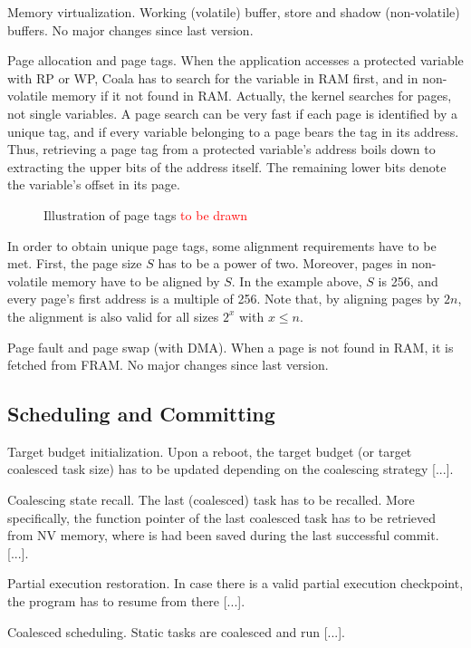 Memory virtualization. Working (volatile) buffer, store and shadow (non-volatile) buffers. No major changes since last version.

Page allocation and page tags. When the application accesses a protected variable with RP or WP, Coala has to search for the variable in RAM first, and in non-volatile memory if it not found in RAM. Actually, the kernel searches for pages, not single variables. A page search can be very fast if each page is identified by a unique tag, and if every variable belonging to a page bears the tag in its address. Thus, retrieving a page tag from a protected variable’s address boils down to extracting the upper bits of the address itself. The remaining lower bits denote the variable’s offset in its page.

\begin{figure}
	\caption{Illustration of page tags \textcolor{red}{to be drawn}}
\end{figure}

In order to obtain unique page tags, some alignment requirements have to be met. First, the page size $S$ has to be a power of two. Moreover, pages in non-volatile memory have to be aligned by $S$. In the example above, $S$ is 256, and every page’s first address is a multiple of 256. Note that, by aligning pages by $2n$, the alignment is also valid for all sizes $2^x$ with $x \leq n$.

Page fault and page swap (with DMA). When a page is not found in RAM, it is fetched from FRAM. No major changes since last version.

\subsection{Scheduling and Committing}

Target budget initialization. Upon a reboot, the target budget (or target coalesced task size) has to be updated depending on the coalescing strategy [...].

Coalescing state recall. The last (coalesced) task has to be recalled. More specifically, the function pointer of the last coalesced task has to be retrieved from NV memory, where is had been saved during the last successful commit. [...].

Partial execution restoration. In case there is a valid partial execution checkpoint, the program has to resume from there [...].

Coalesced scheduling. Static tasks are coalesced and run [...].


